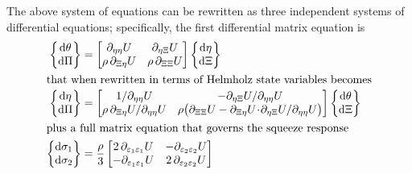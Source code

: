 The above system of equations can be rewritten as three independent systems of differential equations; specifically, the first differential matrix equation is
\begin{subequations}
    \label{hypoelastic3D}
    \begin{align}
    \left\{ \begin{matrix}
    \mathrm{d} \theta \\ \mathrm{d} \Pi
    \end{matrix} \right\} & = \begin{bmatrix}
    \partial_{\eta\eta} U & \partial_{\eta\Xi} U \\
    \rho \, \partial_{\Xi\eta} U & \rho \, \partial_{\Xi\Xi} U  
    \end{bmatrix}
    \left\{ \begin{matrix}
    \mathrm{d}\eta \\ \mathrm{d} \Xi 
    \end{matrix} \right\} \notag \\
    \intertext{that when rewritten in terms of Helmholz state variables becomes}
    \left\{ \begin{matrix}
    \mathrm{d} \eta \\ \mathrm{d} \Pi 
    \end{matrix} \right\} & = \begin{bmatrix}
    1 / \partial_{\eta\eta} U & -\partial_{\eta\Xi} U / \partial_{\eta\eta} U \\ 
    \rho \, \partial_{\Xi\eta} U / \partial_{\eta\eta} U & 
    \rho \bigl( \partial_{\Xi\Xi} U - \partial_{\Xi\eta} U \!\cdot\! \partial_{\eta\Xi} U / \partial_{\eta\eta} U \bigr)
    \end{bmatrix}
    \left\{ \begin{matrix}
    \mathrm{d} \theta \\ \mathrm{d} \Xi
    \end{matrix} \right\}
    \label{Helmholtz3Disotropic} \\
    \intertext{plus a full matrix equation that governs the squeeze response}
    \left\{ \begin{matrix}
    \mathrm{d} \sigma_1 \\ \mathrm{d} \sigma_2 
    \end{matrix} \right\} & = \frac{\rho}{3} \begin{bmatrix}
    2 \, \partial_{\varepsilon_1 \varepsilon_1} U & - \partial_{\varepsilon_2 \varepsilon_2} U \\
    - \partial_{\varepsilon_1 \varepsilon_1} U & 2 \, \partial_{\varepsilon_2 \varepsilon_2} U 

\end{bmatrix}
\end{align}
\end{subequations}
